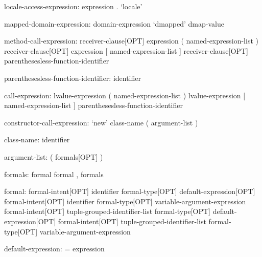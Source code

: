 \begin{syntax}
locale-access-expression:
  expression . `locale'
\end{syntax}

\begin{syntax}
mapped-domain-expression:
  domain-expression `dmapped' dmap-value
\end{syntax}

\begin{syntax}
method-call-expression:
  receiver-clause[OPT] expression ( named-expression-list )
  receiver-clause[OPT] expression [ named-expression-list ]
  receiver-clause[OPT] parenthesesless-function-identifier
\end{syntax}

\begin{syntax}
parenthesesless-function-identifier:
  identifier
\end{syntax}

\begin{syntax}
call-expression:
  lvalue-expression ( named-expression-list )
  lvalue-expression [ named-expression-list ]
  parenthesesless-function-identifier
\end{syntax}

\begin{syntax}
constructor-call-expression:
  `new' class-name ( argument-list )
\end{syntax}

\begin{syntax}
class-name:
  identifier
\end{syntax}

\begin{syntax}
argument-list:
  ( formals[OPT] )
\end{syntax}

\begin{syntax}
formals:
  formal
  formal , formals
\end{syntax}

\begin{syntax}
formal:
  formal-intent[OPT] identifier formal-type[OPT] default-expression[OPT]
  formal-intent[OPT] identifier formal-type[OPT] variable-argument-expression
  formal-intent[OPT] tuple-grouped-identifier-list formal-type[OPT] default-expression[OPT]
  formal-intent[OPT] tuple-grouped-identifier-list formal-type[OPT] variable-argument-expression
\end{syntax}

\begin{syntax}
default-expression:
  = expression
\end{syntax}

